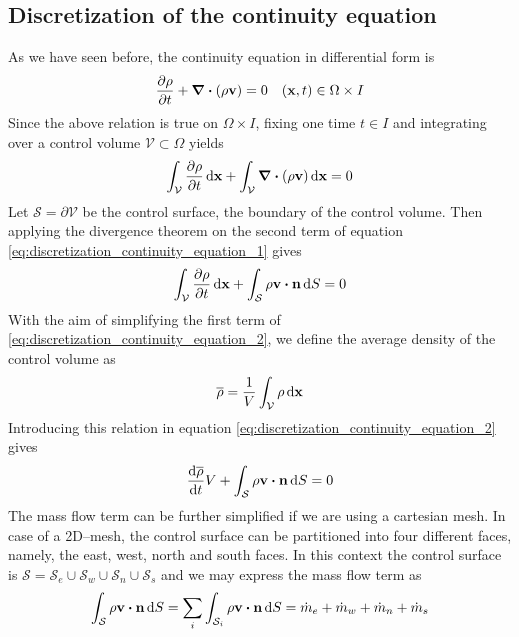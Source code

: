 
\subsection{Discretization of the continuity equation}

As we have seen before, the continuity equation in differential form is
\begin{equation}
	\pdv{\rho}{t} + \div(\rho \vb{v}) = 0 \quad (\vb{x},t) \in \Omega \times I
\end{equation}
Since the above relation is true on $\Omega \times I$, fixing one time $t \in I$ and integrating over a control volume $\mathcal{V} \subset \Omega$ yields
\begin{equation} \label{eq:discretization_continuity_equation_1}
	\int_{\mathcal{V}} \pdv{\rho}{t} \dd{\vb{x}} + \int_{\mathcal{V}} \div(\rho \vb{v}) \dd{\vb{x}} = 0
\end{equation}
Let $\mathcal{S} = \partial \mathcal{V}$ be the control surface, \ie the boundary of the control volume. Then applying the divergence theorem on the second term of equation \eqref{eq:discretization_continuity_equation_1} gives
\begin{equation} \label{eq:discretization_continuity_equation_2}
	\int_{\mathcal{V}} \pdv{\rho}{t} \dd{\vb{x}} + 
	\int_{\mathcal{S}} \rho \vb{v} \vdot \vb{n} \dd{S} = 0
\end{equation}
With the aim of simplifying the first term of \eqref{eq:discretization_continuity_equation_2}, we define the average density of the control volume as
\begin{equation}
	\overline{\rho} = \frac{1}{V} \int_{\mathcal{V}} \rho \dd{\vb{x}}
\end{equation}
Introducing this relation in equation \eqref{eq:discretization_continuity_equation_2} gives
\begin{equation} \label{eq:discretization_continuity_equation_3}
	\frac{\dd \overline{\rho}}{\dd{t}} V + 
	\int_{\mathcal{S}} \rho \vb{v} \vdot \vb{n} \dd{S} = 0
\end{equation}
The mass flow term can be further simplified if we are using a cartesian mesh. In case of a 2D--mesh, the control surface can be partitioned into four different faces, namely, the east, west, north and south faces. In this context the control surface is $\mathcal{S} = \mathcal{S}_e \cup \mathcal{S}_w \cup \mathcal{S}_n \cup \mathcal{S}_s$ and we may express the mass flow term as
\begin{equation}
	\int_{\mathcal{S}} \rho \vb{v} \vdot \vb{n} \dd{S} = 
	\sum_{i} \int_{\mathcal{S}_i} \rho \vb{v} \vdot \vb{n} \dd{S} = 
	\dot{m}_e + \dot{m}_w + \dot{m}_n + \dot{m}_s
\end{equation}
